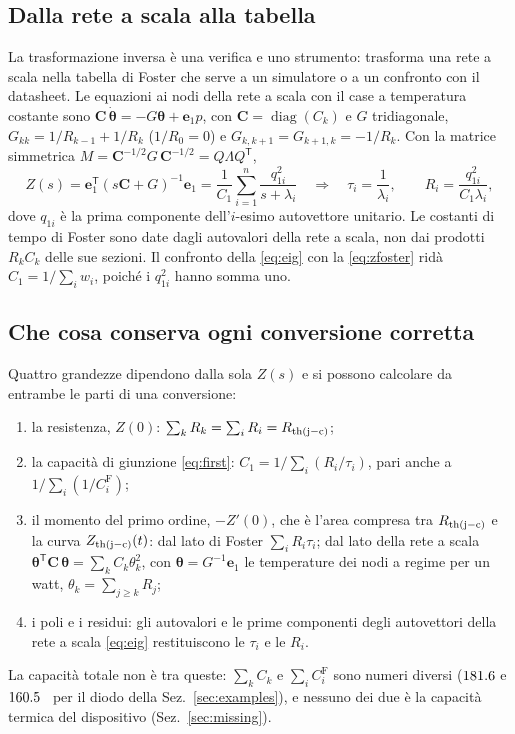\documentclass[10pt,a4paper]{scrartcl}
\let\newcommand\fcitdefine
\newcommand{\Zjc}{Z_\mathrm{th(j-c)}}
\newcommand{\Rjc}{R_\mathrm{th(j-c)}}
\newcommand{\JK}{\si{\joule\per\kelvin}}
\begin{document}
\subsection{Dalla rete a scala alla tabella}
\label{sec:inverse}
La trasformazione inversa è una verifica e uno strumento: trasforma una rete a scala nella tabella di Foster che serve a un simulatore o a un confronto con il datasheet. Le equazioni ai nodi della rete a scala con il case a temperatura costante sono $\mathbf{C}\,\dot{\boldsymbol\theta} = -G\boldsymbol\theta + \mathbf{e}_1 p$, con $\mathbf{C} = \operatorname{diag}(C_k)$ e $G$ tridiagonale, $G_{kk} = 1/R_{k-1} + 1/R_k$ ($1/R_0 = 0$) e $G_{k,k+1} = G_{k+1,k} = -1/R_k$. Con la matrice simmetrica $M = \mathbf{C}^{-1/2}G\,\mathbf{C}^{-1/2} = Q\Lambda Q^\mathsf{T}$,
\begin{equation}
Z(s) = \mathbf{e}_1^\mathsf{T}(s\mathbf{C} + G)^{-1}\mathbf{e}_1 = \frac{1}{C_1}\sum_{i=1}^{n} \frac{q_{1i}^2}{s + \lambda_i}
\quad\Longrightarrow\quad
\tau_i = \frac{1}{\lambda_i} , \qquad R_i = \frac{q_{1i}^2}{C_1\lambda_i} ,
\label{eq:eig}
\end{equation}
dove $q_{1i}$ è la prima componente dell'$i$-esimo autovettore unitario. Le costanti di tempo di Foster sono date dagli autovalori della rete a scala, non dai prodotti $R_kC_k$ delle sue sezioni. Il confronto della \eqref{eq:eig} con la \eqref{eq:zfoster} ridà $C_1 = 1/\sum_i w_i$, poiché i $q_{1i}^2$ hanno somma uno.

\subsection{Che cosa conserva ogni conversione corretta}
\label{sec:checks}
Quattro grandezze dipendono dalla sola $Z(s)$ e si possono calcolare da entrambe le parti di una conversione:
\begin{enumerate}
\item la resistenza, $Z(0)$: $\sum_k R_k = \sum_i R_i = \Rjc$;
\item la capacità di giunzione \eqref{eq:first}: $C_1 = 1/\sum_i (R_i/\tau_i)$, pari anche a $1/\sum_i (1/C_i^\mathrm{F})$;
\item il momento del primo ordine, $-Z'(0)$, che è l'area compresa tra $\Rjc$ e la curva $\Zjc(t)$: dal lato di Foster $\sum_i R_i\tau_i$; dal lato della rete a scala $\boldsymbol\theta^\mathsf{T}\mathbf{C}\,\boldsymbol\theta = \sum_k C_k\theta_k^2$, con $\boldsymbol\theta = G^{-1}\mathbf{e}_1$ le temperature dei nodi a regime per un watt, $\theta_k = \sum_{j\ge k} R_j$;
\item i poli e i residui: gli autovalori e le prime componenti degli autovettori della rete a scala \eqref{eq:eig} restituiscono le $\tau_i$ e le $R_i$.
\end{enumerate}
La capacità totale non è tra queste: $\sum_k C_k$ e $\sum_i C^\mathrm{F}_i$ sono numeri diversi ($181.6$ e $160.5$~\JK{} per il diodo della Sez.~\ref{sec:examples}), e nessuno dei due è la capacità termica del dispositivo (Sez.~\ref{sec:missing}).
\end{document}
